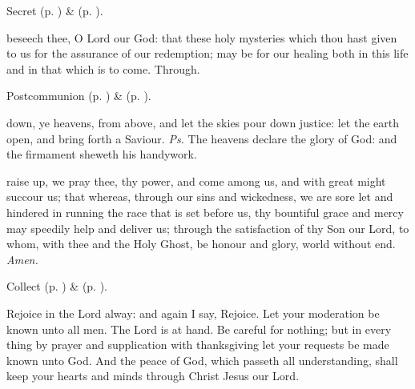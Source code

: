 \begin{rubric}
     Secret  (p. \pageref{AdventISecret}) \&   (p. \pageref{SPMaryInAdvent}).
\end{rubric}

\postcommunion
{} beseech thee, O Lord our God: that these holy mysteries which thou hast given to us for the assurance of our redemption; may be for our healing both in this life and in that which is to come. Through.

\begin{rubric}
     Postcommunion  (p. \pageref{AdventIPostcommunion}) \&   (p. \pageref{SPMaryInAdvent}).
\end{rubric}


\clearpage
{}
\feastdate{}{}


\introit
{} down, ye heavens, from above, and let the skies pour down justice: let the earth open, and bring forth a Saviour. \textit{Ps.} The heavens declare the glory of God: and the firmament sheweth his handywork.

\collect
{} raise up, we pray thee, thy power, and come among us, and with great might succour us; that whereas, through our sins and wickedness, we are sore let and hindered in running the race that is set before us, thy bountiful grace and mercy may speedily help and deliver us; through the satisfaction of thy Son our Lord, to whom, with thee and the Holy Ghost, be honour and glory, world without end. \textit{Amen.}

\begin{rubric}
     Collect  (p. \pageref{AdventICollect}) \&   (p. \pageref{SPMaryInAdvent}).
\end{rubric}

 Rejoice in the Lord alway: and again I say, Rejoice. Let your moderation be known unto all men. The Lord is at hand. Be careful for nothing; but in every thing by prayer and supplication with thanksgiving let your requests be made known unto God. And the peace of God, which passeth all understanding, shall keep your hearts and minds through Christ Jesus our Lord.


